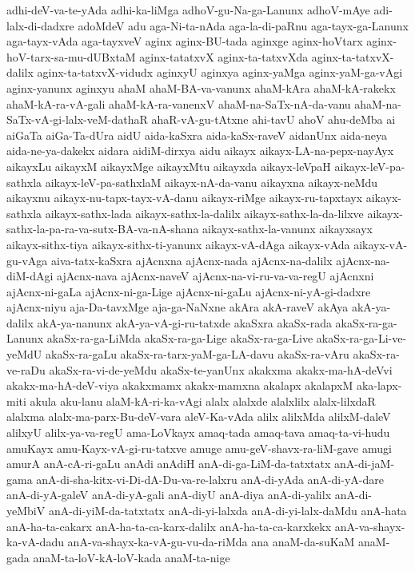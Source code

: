 {adhi-deV-va-te-yAda
adhi-ka-liMga
adhoV-gu-Na-ga-Lanunx
adhoV-mAye
adi-lalx-di-dadxre
adoMdeV
adu
aga-Ni-ta-nAda
aga-la-di-paRnu
aga-tayx-ga-Lanunx
aga-tayx-vAda
aga-tayxveV
aginx
aginx-BU-tada
aginxge
aginx-hoVtarx
aginx-hoV-tarx-sa-mu-dUBxtaM
aginx-tatatxvX
aginx-ta-tatxvXda
aginx-ta-tatxvX-dalilx
aginx-ta-tatxvX-vidudx
aginxyU
aginxya
aginx-yaMga
aginx-yaM-ga-vAgi
aginx-yanunx
aginxyu
ahaM
ahaM-BA-va-vanunx
ahaM-kAra
ahaM-kA-rakekx
ahaM-kA-ra-vA-gali
ahaM-kA-ra-vanenxV
ahaM-na-SaTx-nA-da-vanu
ahaM-na-SaTx-vA-gi-lalx-veM-dathaR
ahaR-vA-gu-tAtxne
ahi-tavU
ahoV
ahu-deMba
ai
aiGaTa
aiGa-Ta-dUra
aidU
aida-kaSxra
aida-kaSx-raveV
aidanUnx
aida-neya
aida-ne-ya-dakekx
aidara
aidiM-dirxya
aidu
aikayx
aikayx-LA-na-pepx-nayAyx
aikayxLu
aikayxM
aikayxMge
aikayxMtu
aikayxda
aikayx-leVpaH
aikayx-leV-pa-sathxla
aikayx-leV-pa-sathxlaM
aikayx-nA-da-vanu
aikayxna
aikayx-neMdu
aikayxnu
aikayx-nu-tapx-tayx-vA-danu
aikayx-riMge
aikayx-ru-tapxtayx
aikayx-sathxla
aikayx-sathx-lada
aikayx-sathx-la-dalilx
aikayx-sathx-la-da-lilxve
aikayx-sathx-la-pa-ra-va-sutx-BA-va-nA-shana
aikayx-sathx-la-vanunx
aikayxsayx
aikayx-sithx-tiya
aikayx-sithx-ti-yanunx
aikayx-vA-dAga
aikayx-vAda
aikayx-vA-gu-vAga
aiva-tatx-kaSxra
ajAcnxna
ajAcnx-nada
ajAcnx-na-dalilx
ajAcnx-na-diM-dAgi
ajAcnx-nava
ajAcnx-naveV
ajAcnx-na-vi-ru-va-va-regU
ajAcnxni
ajAcnx-ni-gaLa
ajAcnx-ni-ga-Lige
ajAcnx-ni-gaLu
ajAcnx-ni-yA-gi-dadxre
ajAcnx-niyu
aja-Da-tavxMge
aja-ga-NaNxne
akAra
akA-raveV
akAya
akA-ya-dalilx
akA-ya-nanunx
akA-ya-vA-gi-ru-tatxde
akaSxra
akaSx-rada
akaSx-ra-ga-Lanunx
akaSx-ra-ga-LiMda
akaSx-ra-ga-Lige
akaSx-ra-ga-Live
akaSx-ra-ga-Li-ve-yeMdU
akaSx-ra-gaLu
akaSx-ra-tarx-yaM-ga-LA-davu
akaSx-ra-vAru
akaSx-ra-ve-raDu
akaSx-ra-vi-de-yeMdu
akaSx-te-yanUnx
akakxma
akakx-ma-hA-deVvi
akakx-ma-hA-deV-viya
akakxmamx
akakx-mamxna
akalapx
akalapxM
aka-lapx-miti
akula
aku-lanu
alaM-kA-ri-ka-vAgi
alalx
alalxde
alalxlilx
alalx-lilxdaR
alalxma
alalx-ma-parx-Bu-deV-vara
aleV-Ka-vAda
alilx
alilxMda
alilxM-daleV
alilxyU
alilx-ya-va-regU
ama-LoVkayx
amaq-tada
amaq-tava
amaq-ta-vi-hudu
amuKayx
amu-Kayx-vA-gi-ru-tatxve
amuge
amu-geV-shavx-ra-liM-gave
amugi
amurA
anA-cA-ri-gaLu
anAdi
anAdiH
anA-di-ga-LiM-da-tatxtatx
anA-di-jaM-gama
anA-di-sha-kitx-vi-Di-dA-Du-va-re-lalxru
anA-di-yAda
anA-di-yA-dare
anA-di-yA-galeV
anA-di-yA-gali
anA-diyU
anA-diya
anA-di-yalilx
anA-di-yeMbiV
anA-di-yiM-da-tatxtatx
anA-di-yi-lalxda
anA-di-yi-lalx-daMdu
anA-hata
anA-ha-ta-cakarx
anA-ha-ta-ca-karx-dalilx
anA-ha-ta-ca-karxkekx
anA-va-shayx-ka-vA-dadu
anA-va-shayx-ka-vA-gu-vu-da-riMda
ana
anaM-da-suKaM
anaM-gada
anaM-ta-loV-kA-loV-kada
anaM-ta-nige
}
